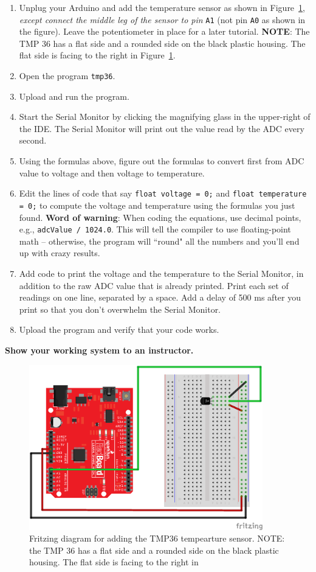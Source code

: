 \documentclass[11pt]{article} %
\begin{document}
\begin{enumerate}
\item Unplug your Arduino and add the temperature sensor as shown in Figure~\ref{fig:tmp36}, \emph{except connect the middle leg of the sensor to pin} \verb|A1| (not pin \verb|A0| as shown in the figure). Leave the potentiometer in place for a later tutorial.
\textbf{NOTE}: The TMP 36 has a flat side and a rounded side on the black plastic housing. The flat side is facing to the right in Figure~\ref{fig:tmp36}.
\item Open the program \verb|tmp36|.
\item Upload and run the program. 
\item Start the Serial Monitor by clicking the magnifying glass in the upper-right of the IDE. The Serial Monitor will print out the value read by the ADC every second.
\item Using the formulas above, figure out the formulas to convert first from ADC value to voltage and then voltage to temperature.
\item Edit the lines of code that say \verb|float voltage = 0;| and \verb|float temperature = 0;| to compute the voltage and temperature using the formulas you just found. \textbf{Word of warning}: When coding the equations, use decimal points, e.g., \verb|adcValue / 1024.0|. This will tell the compiler to use floating-point math -- otherwise, the program will ``round" all the numbers and you'll end up with crazy results.
\item Add code to print the voltage and the temperature to the Serial Monitor, in addition to the raw ADC value that is already printed. Print each set of readings on one line, separated by a space. Add a delay of 500 ms after you print so that you don't overwhelm the Serial Monitor.
\item Upload the program and verify that your code works.
\end{enumerate}

{\bf Show your working system to an instructor.}

\begin{figure}[htbp]
\begin{center}
\includegraphics[width=4in]{figures/tmp36_fritz.png}
\caption{Fritzing diagram for adding the TMP36 tempearture sensor.  NOTE: the TMP 36 has a flat side and a rounded side on the black plastic housing.  The flat side is facing to the right in}
\label{fig:tmp36}
\end{center}
\end{figure}
\end{document}
